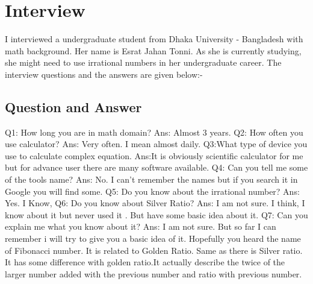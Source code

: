 \documentclass{article}
\begin{document}
\section{Interview}
I interviewed a undergraduate student from Dhaka University - Bangladesh with math background. Her name is Esrat Jahan Tonni. As she is currently studying, she might need to use irrational numbers in her undergraduate career. The interview questions and the answers are given below:-\newline

\subsection{Question and Answer}
Q1: How long you are in math domain? \newline
Ans: Almost 3 years.\newline\newline
Q2: How often you use calculator?\newline
Ans: Very often. I mean almost daily.\newline \newline
Q3:What type of device you use to calculate complex equation.\newline
Ans:It is obviously scientific calculator for me but for advance user there are many software available.\newline\newline
Q4: Can you tell me some of the tools name?\newline
Ans: No. I can't remember the names but if you search it in Google you will find some.\newline\newline
Q5: Do you know about the irrational number?\newline
Ans: Yes. I Know,\newline\newline
Q6: Do you know about Silver Ratio?\newline
Ans: I am not sure. I think, I know about it but never used it . But have some basic idea about it. \newline\newline
Q7: Can you explain me what you know about it?\newline
Ans: I am not sure. But so far I can remember i will try to give you a basic idea of it. Hopefully you heard the name of Fibonacci number. It is related to Golden Ratio. Same as there is Silver ratio. It has some difference with golden ratio.It actually describe the twice  of the larger number added with the previous number and ratio with previous number.\newline\newline
\end{document}
